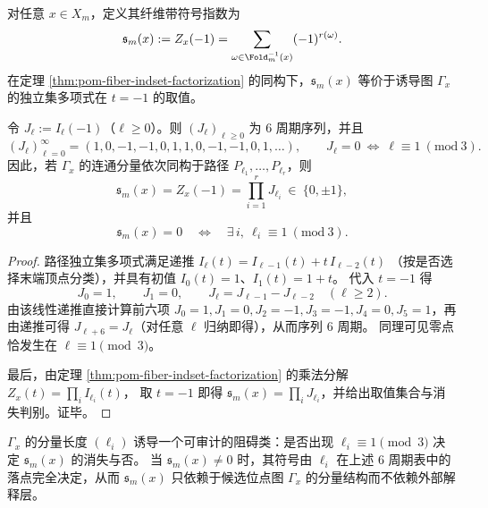 \begin{definition}[纤维的带符号指数]\label{def:pom-fiber-signed-index}
对任意 \(x\in X_m\)，定义其纤维带符号指数为
\[
\mathfrak{s}_m(x):=Z_x(-1)=\sum_{\omega\in\Fold_m^{-1}(x)}(-1)^{r(\omega)}.
\]
在定理 \ref{thm:pom-fiber-indset-factorization} 的同构下，\(\mathfrak{s}_m(x)\) 等价于诱导图 \(\Gamma_x\) 的独立集多项式在 \(t=-1\) 的取值。
\end{definition}

\begin{theorem}[分量级周期律与消失判别]\label{thm:pom-fiber-signed-index-periodicity}
令 \(J_\ell:=I_\ell(-1)\)（\(\ell\ge 0\)）。则 \((J_\ell)_{\ell\ge 0}\) 为 \(6\) 周期序列，并且
\[
(J_\ell)_{\ell=0}^{\infty}=(1,0,-1,-1,0,1,1,0,-1,-1,0,1,\dots),
\qquad
J_\ell=0\ \Longleftrightarrow\ \ell\equiv 1\ (\mathrm{mod}\ 3).
\]
因此，若 \(\Gamma_x\) 的连通分量依次同构于路径 \(P_{\ell_1},\dots,P_{\ell_r}\)，则
\[
\mathfrak{s}_m(x)=Z_x(-1)=\prod_{i=1}^r J_{\ell_i}\ \in\ \{0,\pm 1\},
\]
并且
\[
\mathfrak{s}_m(x)=0
\quad\Longleftrightarrow\quad
\exists\,i,\ \ell_i\equiv 1\ (\mathrm{mod}\ 3).
\]
\end{theorem}

\begin{proof}
路径独立集多项式满足递推
\(
I_\ell(t)=I_{\ell-1}(t)+t\,I_{\ell-2}(t)
\)
（按是否选择末端顶点分类），并具有初值 \(I_0(t)=1\)、\(I_1(t)=1+t\)。
代入 \(t=-1\) 得
\[
J_0=1,\qquad J_1=0,\qquad J_\ell=J_{\ell-1}-J_{\ell-2}\quad(\ell\ge 2).
\]
由该线性递推直接计算前六项
\(
J_0=1,J_1=0,J_2=-1,J_3=-1,J_4=0,J_5=1
\)，再由递推可得 \(J_{\ell+6}=J_\ell\)（对任意 \(\ell\) 归纳即得），从而序列 \(6\) 周期。
同理可见零点恰发生在 \(\ell\equiv 1\pmod 3\)。
\par
最后，由定理 \ref{thm:pom-fiber-indset-factorization} 的乘法分解
\(
Z_x(t)=\prod_i I_{\ell_i}(t)
\)，
取 \(t=-1\) 即得 \(\mathfrak{s}_m(x)=\prod_i J_{\ell_i}\)，并给出取值集合与消失判别。证毕。
\end{proof}

\begin{corollary}\label{cor:pom-fiber-signed-index-mod3}
\(\Gamma_x\) 的分量长度 \((\ell_i)\) 诱导一个可审计的阻碍类：是否出现 \(\ell_i\equiv 1\pmod 3\) 决定 \(\mathfrak{s}_m(x)\) 的消失与否。
当 \(\mathfrak{s}_m(x)\neq 0\) 时，其符号由 \(\ell_i\) 在上述 \(6\) 周期表中的落点完全决定，从而 \(\mathfrak{s}_m(x)\) 只依赖于候选位点图 \(\Gamma_x\) 的分量结构而不依赖外部解释层。
\end{corollary}

